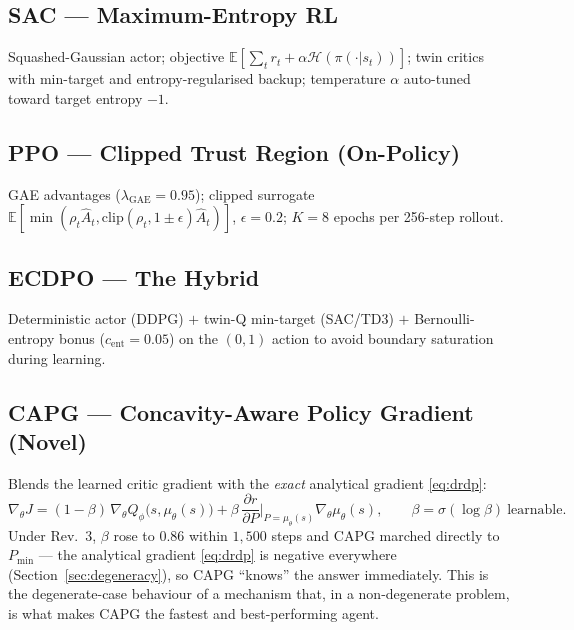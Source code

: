 \documentclass[11pt]{article}
\newcommand{\E}{\mathbb{E}}
\begin{document}
\subsection{SAC --- Maximum-Entropy RL}
Squashed-Gaussian actor; objective $\E[\sum_t r_t + \alpha\mathcal H(\pi(\cdot|s_t))]$; twin
critics with min-target and entropy-regularised backup; temperature $\alpha$ auto-tuned toward
target entropy $-1$.

\subsection{PPO --- Clipped Trust Region (On-Policy)}
GAE advantages ($\lambda_{\mathrm{GAE}}{=}0.95$); clipped surrogate
$\E[\min(\rho_t\hat A_t, \mathrm{clip}(\rho_t,1{\pm}\epsilon)\hat A_t)]$, $\epsilon{=}0.2$;
$K{=}8$ epochs per 256-step rollout.

\subsection{ECDPO --- The Hybrid}
Deterministic actor (DDPG) $+$ twin-Q min-target (SAC/TD3) $+$ Bernoulli-entropy bonus
($c_{\mathrm{ent}}{=}0.05$) on the $(0,1)$ action to avoid boundary saturation during learning.

\subsection{CAPG --- Concavity-Aware Policy Gradient (Novel)}
Blends the learned critic gradient with the \emph{exact} analytical gradient \eqref{eq:drdp}:
\begin{equation}
\nabla_\theta J = (1-\beta)\,\nabla_\theta Q_\phi\big(s,\mu_\theta(s)\big)
+ \beta\,\frac{\partial r}{\partial P}\Big|_{P=\mu_\theta(s)}\nabla_\theta\mu_\theta(s),
\qquad \beta = \sigma(\log\beta)\ \text{learnable}.
\end{equation}
Under Rev.~3, $\beta$ rose to $0.86$ within $1{,}500$ steps and CAPG marched directly to
$P_{\min}$ --- the analytical gradient \eqref{eq:drdp} is negative everywhere (Section~\ref{sec:degeneracy}),
so CAPG ``knows'' the answer immediately. This is the degenerate-case behaviour of a mechanism
that, in a non-degenerate problem, is what makes CAPG the fastest and best-performing agent.

\end{document}
